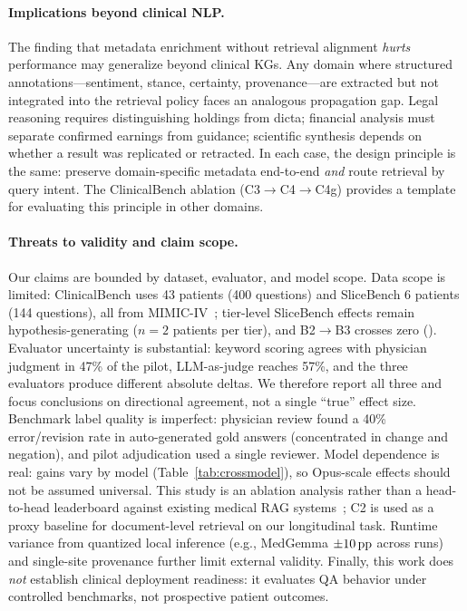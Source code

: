 \begin{sloppypar}
\paragraph{Implications beyond clinical NLP.}
The finding that metadata enrichment without retrieval alignment \emph{hurts} performance may generalize beyond clinical KGs.
Any domain where structured annotations---sentiment, stance, certainty, provenance---are extracted but not integrated into the retrieval policy faces an analogous propagation gap.
Legal reasoning requires distinguishing holdings from dicta; financial analysis must separate confirmed earnings from guidance; scientific synthesis depends on whether a result was replicated or retracted.
In each case, the design principle is the same: preserve domain-specific metadata end-to-end \emph{and} route retrieval by query intent.
The ClinicalBench ablation (C3$\to$C4$\to$C4g) provides a template for evaluating this principle in other domains.
\end{sloppypar}

\paragraph{Threats to validity and claim scope.}
\begin{sloppypar}
Our claims are bounded by dataset, evaluator, and model scope.
Data scope is limited: ClinicalBench uses 43 patients (400 questions) and SliceBench 6 patients (144 questions), all from MIMIC-IV~\cite{johnson2023mimiciv}; tier-level SliceBench effects remain hypothesis-generating ($n\!=\!2$ patients per tier), and B2$\rightarrow$B3 crosses zero (\ci{-1.5\pp}{+5.9\pp}).
Evaluator uncertainty is substantial: keyword scoring agrees with physician judgment in 47\% of the pilot, LLM-as-judge reaches 57\%, and the three evaluators produce different absolute deltas.
We therefore report all three and focus conclusions on directional agreement, not a single ``true'' effect size.
Benchmark label quality is imperfect: physician review found a 40\% error/revision rate in auto-generated gold answers (concentrated in change and negation), and pilot adjudication used a single reviewer.
Model dependence is real: gains vary by model (Table~\ref{tab:crossmodel}), so Opus-scale effects should not be assumed universal.
This study is an ablation analysis rather than a head-to-head leaderboard against existing medical RAG systems~\cite{luo2025gfmrag,jiang2025kare,lu2025doctorrag}; C2 is used as a proxy baseline for document-level retrieval on our longitudinal task.
Runtime variance from quantized local inference (e.g., MedGemma $\pm10\,\text{pp}$ across runs) and single-site provenance further limit external validity.
Finally, this work does \emph{not} establish clinical deployment readiness: it evaluates QA behavior under controlled benchmarks, not prospective patient outcomes.
\end{sloppypar}

